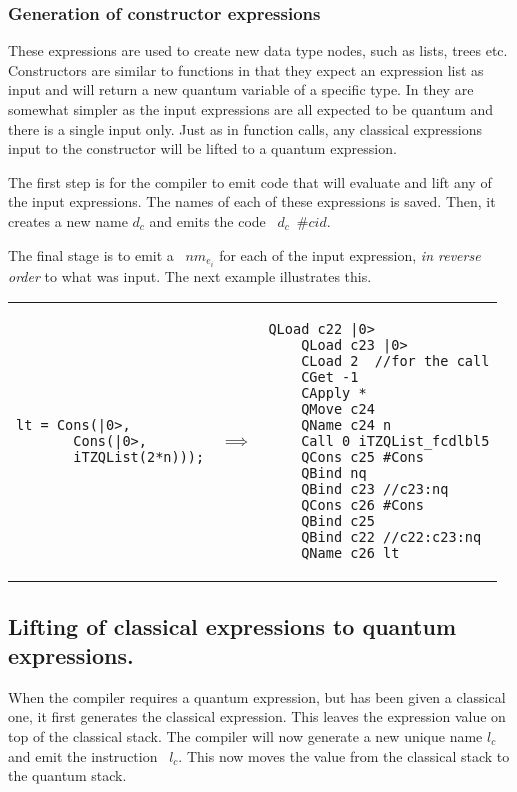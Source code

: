 \subsubsection{Generation of constructor expressions}
These expressions are used to create new data type nodes, such as lists, trees
etc. Constructors are similar to functions in that they expect 
an expression list as input and will return a new quantum variable of a
specific type. In \lqpl{} they are somewhat simpler as the input expressions
are all expected to be quantum and there is a single input only. Just as in
function calls, any classical expressions input to the constructor
will be lifted to a quantum expression.

The first step is for the compiler to emit code that will evaluate and lift
any of the input expressions. The names of each of these expressions is 
saved. Then, it creates a new name $d_c$ and emits the
code ~$d_c$~$\#cid$.

The final stage is to emit a ~$nm_{e_i}$ for each of the
input expression, \emph{in reverse order} to what was input. The next  example 
illustrates this.

\begin{center}
\begin{tabular}{p{2in}p{.3in}p{2.7in}}
{\begin{singlespace}
\begin{lstlisting}[style=linqpl]
lt = Cons(|0>, 
       Cons(|0>,
       iTZQList(2*n)));
\end{lstlisting}
\end{singlespace}}
 & { \qquad \qquad \quad \quad \qquad \qquad $\implies$} &
{\begin{singlespace}
\begin{lstlisting}[style=linqpl]
    QLoad c22 |0> 
    QLoad c23 |0>
    CLoad 2  //for the call
    CGet -1
    CApply *
    QMove c24
    QName c24 n
    Call 0 iTZQList_fcdlbl5
    QCons c25 #Cons
    QBind nq 
    QBind c23 //c23:nq
    QCons c26 #Cons
    QBind c25
    QBind c22 //c22:c23:nq
    QName c26 lt
\end{lstlisting}
\end{singlespace}}
\end{tabular}
\end{center}



\subsection{Lifting of classical expressions to quantum expressions.}\label{subsec:cglifting}
When the compiler requires a quantum expression, but has been given a
classical one, it first generates the classical expression. This leaves
the expression value on top of the classical stack. The compiler will now
generate a new unique name $l_c$ and emit the instruction 
~$l_c$. This now moves the value from the classical stack
to the quantum stack.